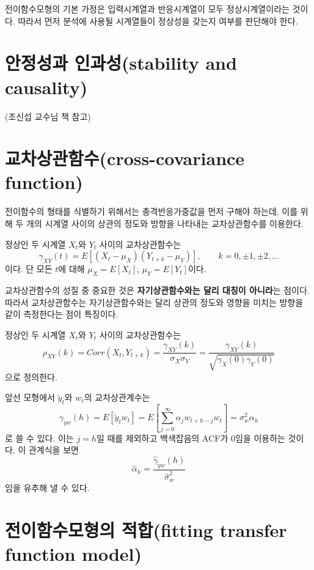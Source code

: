 \documentclass[b5paper,]{scrbook}
\theoremstyle{plain}
\theoremstyle{definition}
\numberwithin{equation}{section}
\let\BeginKnitrBlock\begin \let\EndKnitrBlock\end
\begin{document}
전이함수모형의 기본 가정은 입력시계열과 반응시계열이 모두
정상시계열이라는 것이다. 따라서 먼저 분석에 사용될 시계열들이 정상성을
갖는지 여부를 판단해야 한다.

\section{안정성과 인과성(stability and
causality)}\label{-stability-and-causality}

(조신섭 교수님 책 참고)

\section{교차상관함수(cross-covariance
function)}\label{cross-covariance-function}

전이함수의 형태를 식별하기 위해서는 충격반응가중값을 먼저 구해야 하는데,
이를 위해 두 개의 시계열 사이의 상관의 정도와 방향을 나타내는
교차상관함수를 이용한다.

\BeginKnitrBlock{definition}[교차상관함수]
\protect\hypertarget{def:unnamed-chunk-147}{}{\label{def:unnamed-chunk-147}
{} }정상인 두 시계열 \(X_{t}\)와 \(Y_{t}\)
사이의 교차상관함수는
\[\gamma_{XY}(t)=E[(X_{t}-\mu_{X})(Y_{t+k}-\mu_{Y})], \qquad{k=0,\pm 1, \pm 2, \ldots}\]
이다. 단 모든 \(t\)에 대해 \(\mu_{X}=E[X_{t}]\),
\(\mu_{Y}=E[Y_{t}]\)이다.
\EndKnitrBlock{definition}

교차상관함수의 성질 중 중요한 것은 \textbf{자기상관함수와는 달리 대칭이
아니라}는 점이다. 따라서 교차상관함수는 자기상관함수와는 달리 상관의
정도와 영향을 미치는 방향을 같이 측정한다는 점이 특징이다.

\BeginKnitrBlock{definition}[교차상관계수]
\protect\hypertarget{def:unnamed-chunk-148}{}{\label{def:unnamed-chunk-148}
{} }정상인 두 시계열 \(X_{t}\)와 \(Y_{t}\)
사이의 교차상관함수는
\[\rho_{XY}(k)=Corr(X_{t},Y_{t+k})=\frac{\gamma_{XY}(k)}{\sigma_{X}\sigma_{Y}}=\frac{\gamma_{XY}(k)}{\sqrt{\gamma_{X}(0)\gamma_{Y}(0)}}\]
으로 정의한다.
\EndKnitrBlock{definition}

앞선 모형에서 \(\tilde{y}_{t}\)와 \(w_{t}\)의 교차상관계수는
\[\gamma_{\tilde{y} w}(h)=E[\tilde{y}_{t} w_{t}]=E[\sum_{j=0}^{\infty}\alpha_{j}w_{t+h-j}w_{t}]=\sigma_{w}^{2}\alpha_{h}\]
로 쓸 수 있다. 이는 \(j=h\)일 때를 제외하고 백색잡음의 ACF가 0임을
이용하는 것이다. 이 관계식을 보면
\[\hat{\alpha}_{h}=\frac{\hat{\gamma}_{\tilde{y}w}(h)}{\hat{\sigma}_{w}^{2}}\]
임을 유추해 낼 수 있다.

\section{전이함수모형의 적합(fitting transfer function
model)}\label{-fitting-transfer-function-model}
\end{document}
